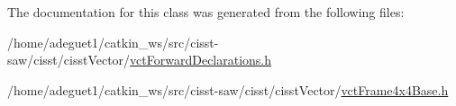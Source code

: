 The documentation for this class was generated from the following files\-:\begin{DoxyCompactItemize}
\item 
/home/adeguet1/catkin\-\_\-ws/src/cisst-\/saw/cisst/cisst\-Vector/\hyperlink{vct_forward_declarations_8h}{vct\-Forward\-Declarations.\-h}\item 
/home/adeguet1/catkin\-\_\-ws/src/cisst-\/saw/cisst/cisst\-Vector/\hyperlink{vct_frame4x4_base_8h}{vct\-Frame4x4\-Base.\-h}\end{DoxyCompactItemize}
